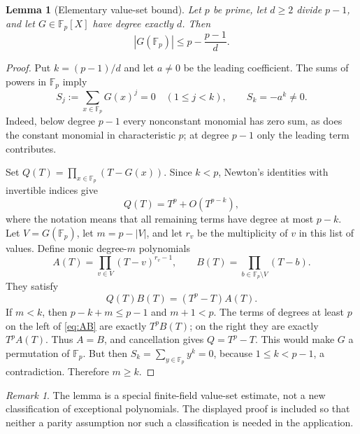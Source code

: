 \documentclass[11pt,a4paper]{article}
\newtheorem{lemma}[theorem]{Lemma}
\theoremstyle{definition}
\theoremstyle{remark}
\newtheorem{remark}[theorem]{Remark}
\newcommand{\F}{\mathbb F}
\begin{document}
\begin{lemma}[Elementary value-set bound]\label{lem:values}
Let $p$ be prime, let $d\ge2$ divide $p-1$, and let
$G\in\F_p[X]$ have degree exactly $d$. Then
\[
 |G(\F_p)|\le p-\frac{p-1}{d}.
\]
\end{lemma}
\begin{proof}
Put $k=(p-1)/d$ and let $a\ne0$ be the leading coefficient. The sums
of powers in $\F_p$ imply
\[
 S_j:=\sum_{x\in\F_p}G(x)^j=0\quad(1\le j<k),
 \qquad S_k=-a^k\ne0.
\]
Indeed, below degree $p-1$ every nonconstant monomial has zero sum,
as does the constant monomial in characteristic $p$; at degree $p-1$
only the leading term contributes.

Set $Q(T)=\prod_{x\in\F_p}(T-G(x))$. Since $k<p$, Newton's identities
with invertible indices give
\[
 Q(T)=T^p+O(T^{p-k}),
\]
where the notation means that all remaining terms have degree at most
$p-k$. Let $V=G(\F_p)$, let $m=p-|V|$, and let $r_v$ be the multiplicity
of $v$ in this list of values. Define monic degree-$m$ polynomials
\[
 A(T)=\prod_{v\in V}(T-v)^{r_v-1},
 \qquad B(T)=\prod_{b\in\F_p\setminus V}(T-b).
\]
They satisfy
\begin{equation}\label{eq:AB}
 Q(T)B(T)=(T^p-T)A(T).
\end{equation}
If $m<k$, then $p-k+m\le p-1$ and $m+1<p$. The terms of degrees
at least $p$ on the left of \eqref{eq:AB} are exactly $T^pB(T)$; on the
right they are exactly $T^pA(T)$. Thus $A=B$, and cancellation gives
$Q=T^p-T$. This would make $G$ a permutation of $\F_p$. But then
$S_k=\sum_{y\in\F_p}y^k=0$, because $1\le k<p-1$, a contradiction.
Therefore $m\ge k$.
\end{proof}

\begin{remark}
The lemma is a special finite-field value-set estimate, not a new
classification of exceptional polynomials. The displayed proof is
included so that neither a parity assumption nor such a classification
is needed in the application.
\end{remark}
\end{document}
